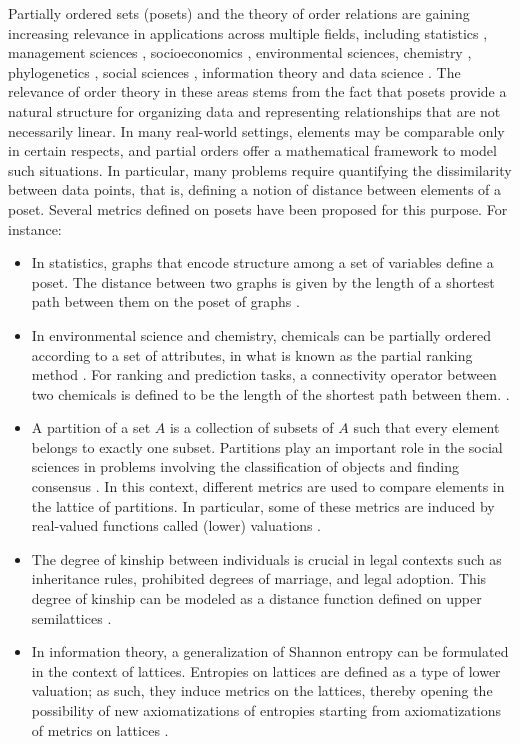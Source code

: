 \documentclass{article}[12pt]
\theoremstyle{exampstyle}
\theoremstyle{remark}
\begin{document}
Partially ordered sets (posets) and the theory of order relations are gaining increasing relevance in applications across multiple fields, including statistics \cite{model_oriented_graphdistance, Arcagni2022}, management sciences \cite{distances_agent_preferences},  socioeconomics \cite{fattore2017partial, Arcagni2022}, environmental sciences, chemistry \cite{Bruggemann1999,partial_order_chemistry_environmental}, phylogenetics \cite{phylogenetic}, social sciences \cite{Day1981, Barthlemy1982,discrete_poset_distances}, information theory \cite{Simovici} and data science \cite{machinelearning}. The relevance of order theory in these areas stems from the fact that posets provide a natural structure for organizing data and representing relationships that are not necessarily linear. In many real-world settings, elements may be comparable only in certain respects, and partial orders offer a mathematical framework to model such situations. In particular, many problems require quantifying the dissimilarity between data points, that is, defining a notion of distance between elements of a poset. Several metrics defined on posets have been proposed for this purpose. For instance:
\begin{itemize}
    \item In statistics, graphs that encode structure among a set of variables define a poset. The distance between two graphs is given by the length of a shortest path between them on the poset of graphs \cite{model_oriented_graphdistance}.
    \item In environmental science and chemistry, chemicals can be partially ordered according to a set of attributes, in what is known as the partial ranking method \cite{Bruggemann1999}. For ranking and prediction tasks, a connectivity operator between two chemicals is defined to be the length of the shortest path between them. \cite{partial_order_chemistry_environmental}.
    \item A partition of a set $A$ is a collection of subsets of $A$ such that every element belongs to exactly one subset. Partitions play an important role in the social sciences in problems involving the classification of objects and finding consensus \cite{Day1981}. In this context, different metrics are used to compare elements in the lattice of partitions. In particular, some of these metrics are induced by real-valued functions called (lower) valuations \cite{monjardet}. 
    \item The degree of kinship between individuals is crucial in legal contexts such as inheritance rules, prohibited degrees of marriage, and legal adoption. This degree of kinship can be modeled as a distance function defined on upper semilattices \cite{discrete_poset_distances}.
    \item In information theory, a generalization of Shannon entropy can be formulated in the context of lattices. Entropies on lattices are defined as a type of lower valuation; as such, they induce metrics on the lattices, thereby opening the possibility of new axiomatizations of entropies starting from axiomatizations of metrics on lattices \cite{Simovici}.
\end{itemize}
\end{document}
